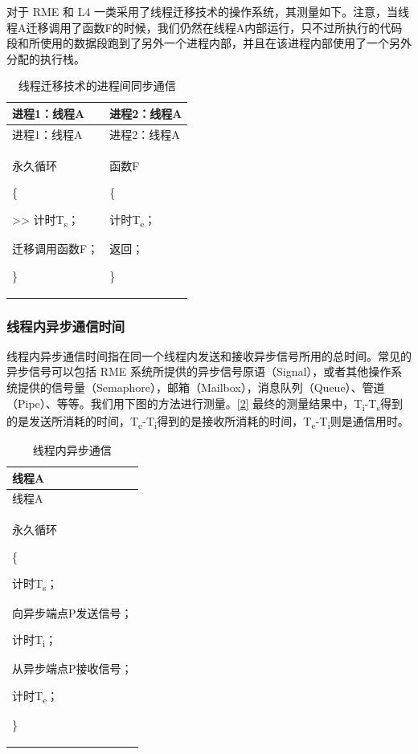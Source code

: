 对于 RME 和 L4 一类采用了线程迁移技术的操作系统，其测量如下。注意，当线程A迁移调用了函数F的时候，我们仍然在线程A内部运行，只不过所执行的代码段和所使用的数据段跑到了另外一个进程内部，并且在该进程内部使用了一个另外分配的执行栈。

\begin{xltabular}{\textwidth}{@{}>{\hsize\raggedright\arraybackslash}X>{\hsize\raggedright\arraybackslash}X@{}}
\caption{线程迁移技术的进程间同步通信}\label{tab:1-7-thread-migration-sync-communication}\\
\toprule
进程1：线程A & 进程2：线程A\tabularnewline
\endfirsthead
\toprule
进程1：线程A & 进程2：线程A\tabularnewline
\midrule
\endhead
\bottomrule
\endlastfoot
永久循环

\{

\textgreater\textgreater{} 计时T\textsubscript{s}；

迁移调用函数F；

\}\strut
 & 函数F

\{

计时T\textsubscript{e}；

返回；

\}\strut
\tabularnewline
\end{xltabular}

\subsubsection{线程内异步通信时间}\label{subsubsec:1-intra-thread-async-communication}

线程内异步通信时间指在同一个线程内发送和接收异步信号所用的总时间。常见的异步信号可以包括 RME 系统所提供的异步信号原语（Signal），或者其他操作系统提供的信号量（Semaphore），邮箱（Mailbox），消息队列（Queue）、管道（Pipe）、等等。我们用下图的方法进行测量。\hyperref[cite:1-2]{{[}2{]}}
最终的测量结果中，T\textsubscript{i}-T\textsubscript{s}得到的是发送所消耗的时间，T\textsubscript{e}-T\textsubscript{i}得到的是接收所消耗的时间，T\textsubscript{e}-T\textsubscript{i}则是通信用时。

\begin{xltabular}{\textwidth}{@{}>{\hsize\raggedright\arraybackslash}X@{}}
\caption{线程内异步通信}\label{tab:1-8-intra-thread-async-communication}\\
\toprule
线程A\tabularnewline
\endfirsthead
\toprule
线程A\tabularnewline
\midrule
\endhead
\bottomrule
\endlastfoot
永久循环

\{

计时T\textsubscript{s}；

向异步端点P发送信号；

计时T\textsubscript{i}；

从异步端点P接收信号；

计时T\textsubscript{e}；

\}\strut
\tabularnewline
\end{xltabular}


